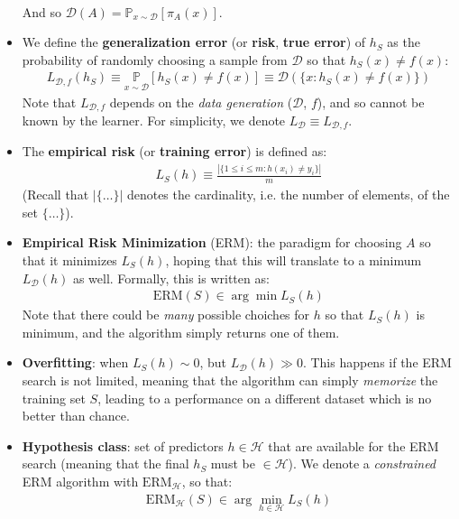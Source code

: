 \documentclass[../template.tex]{subfiles}
\begin{document}
\begin{itemize}
\begin{align*}
    \end{align*} 
    And so $\mathcal{D}(A) = \mathbb{P}_{x \sim \mathcal{D}}[\pi_A(x)]$.
    \item We define the \textbf{generalization error} (or \textbf{risk}, \textbf{true error})  of $h_S$ as the probability of randomly choosing a sample from $\mathcal{D}$ so that $h_S(x) \neq f(x)$:
    \begin{align*}
        L_{\mathcal{D},f}(h_S) \equiv \underset{x \sim \mathcal{D}}{\mathbb{P}}[h_S(x) \neq f(x)] \equiv \mathcal{D}(\{x \colon h_S(x) \neq f(x)\})
    \end{align*} 
    Note that $L_{\mathcal{D},f}$ depends on the \textit{data generation} ($\mathcal{D}$, $f$), and so cannot be known by the learner. For simplicity, we denote $L_{\mathcal{D}} \equiv L_{\mathcal{D},f}$.
    \item The \textbf{empirical risk} (or \textbf{training error}) is defined as:
    \begin{align*}
        L_S(h) \equiv \frac{|\{1 \leq i \leq m\colon h(x_i) \neq y_i\}|}{m} 
    \end{align*} 
    (Recall that $|\{\dots \}|$ denotes the cardinality, i.e. the number of elements, of the set $\{\dots\}$).
    \item \textbf{Empirical Risk Minimization} (ERM): the paradigm for choosing $A$ so that it minimizes $L_S(h)$, hoping that this will translate to a minimum $L_{\mathcal{D}}(h)$ as well. Formally, this is written as:
    \begin{align*}
        \mathrm{ERM}(S) \in \arg\min L_S(h)
    \end{align*}  
    Note that there could be \textit{many} possible choiches for $h$ so that $L_S(h)$ is minimum, and the algorithm simply returns one of them. 
    \item \textbf{Overfitting}: when $L_S(h) \sim 0$, but $L_{\mathcal{D}}(h) \gg 0$.  This happens if the ERM search is not limited, meaning that the algorithm can simply \textit{memorize} the training set $S$, leading to a performance on a different dataset which is no better than chance.
    \item \textbf{Hypothesis class}: set of predictors $h \in \mathcal{H}$ that are available for the ERM search (meaning that the final $h_S$ must be $\in \mathcal{H}$). We denote a \textit{constrained } ERM algorithm with $\mathrm{ERM}_{\mathcal{H}}$, so that:
    \begin{align*}
        \mathrm{ERM}_{\mathcal{H}}(S) \in \arg\min_{h\in \mathcal{H}} L_S(h) 

\end{align*}
\end{itemize}
\end{document}
